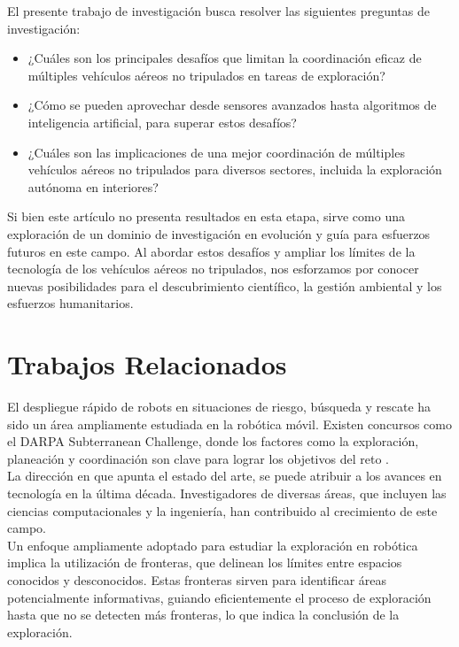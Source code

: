 \documentclass[sigconf]{acmart}
\begin{document}
El presente trabajo de investigación busca resolver las siguientes preguntas de investigación:

\begin{itemize}
  \item ¿Cuáles son los principales desafíos que limitan la coordinación eficaz de múltiples vehículos aéreos no tripulados en tareas de exploración?
  \item ¿Cómo se pueden aprovechar desde sensores avanzados hasta algoritmos de inteligencia artificial, para superar estos desafíos?
  \item ¿Cuáles son las implicaciones de una mejor coordinación de múltiples vehículos aéreos no tripulados para diversos sectores, incluida la exploración autónoma en interiores?
\end{itemize}

Si bien este artículo no presenta resultados en esta etapa, sirve como una exploración de un dominio de investigación en evolución y guía para esfuerzos futuros en este campo. Al abordar estos desafíos y ampliar los límites de la tecnología de los vehículos aéreos no tripulados, nos esforzamos por conocer nuevas posibilidades para el descubrimiento científico, la gestión ambiental y los esfuerzos humanitarios.

\section{Trabajos Relacionados}

El despliegue rápido de robots en situaciones de riesgo, búsqueda y rescate ha sido un área ampliamente estudiada en la robótica móvil. Existen concursos como el DARPA Subterranean Challenge, donde los factores como la exploración, planeación y coordinación son clave para lograr los objetivos del reto \cite{DARPA2022}.\\

La dirección en que apunta el estado del arte, se puede atribuir a los avances en tecnología en la última década. Investigadores de diversas áreas, que incluyen las ciencias computacionales y la ingeniería, han contribuido al crecimiento de este campo.\\

Un enfoque ampliamente adoptado para estudiar la exploración en robótica implica la utilización de fronteras, que delinean los límites entre espacios conocidos y desconocidos. Estas fronteras sirven para identificar áreas potencialmente informativas, guiando eficientemente el proceso de exploración hasta que no se detecten más fronteras, lo que indica la conclusión de la exploración.\\
\end{document}
